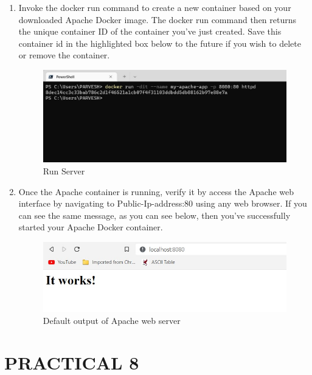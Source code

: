 \documentclass[12pt]{article}
\begin{document}
\begin{enumerate}
\item Invoke the docker run command to create a new container based on your downloaded Apache Docker image. The docker run command then returns the unique container ID of the container you’ve just created. Save this container id in the highlighted box below to the future if you wish to delete or remove the container.

\begin{figure}[H]
\centering
\includegraphics[scale=0.6]{fig24}
\caption{Run Server}
\vspace{0.6\baselineskip}
\end{figure}	

\item Once the Apache container is running, verify it by access the Apache web interface by navigating to Public-Ip-address:80 using any web browser. If you can see the same message, as you can see below, then you’ve successfully started your Apache Docker container.

\begin{figure}[H]
\centering
\includegraphics[scale=0.7]{fig25}
\caption{Default output of Apache web server}
\vspace{0.6\baselineskip}
\end{figure}	

\end{enumerate}

\clearpage


\section{PRACTICAL 8}
\end{document}
